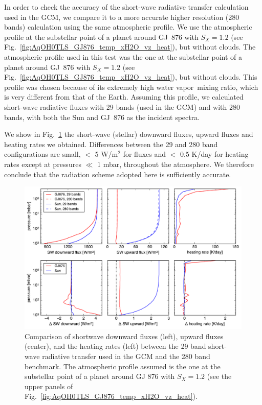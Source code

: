 \documentclass[11pt,numberedappendix,twocolappendix,]{emulateapj}
\newcommand{\wv}{{\color{orange}water vapor\ }}
\begin{document}
In order to check the accuracy of the short-wave radiative transfer calculation used in the GCM, we compare it to a more accurate higher resolution (280 bands) calculation using the same atmospheric profile. 
We use the atmospheric profile at the substellar point of a planet around GJ~876 with $S_X=1.2$ (see Fig.~\ref{fig:AqOH0TLS_GJ876_temp_xH2O_vz_heat}), but without clouds.
The atmospheric profile used in this test was the one at the substellar point of a planet around GJ~876 with $S_X=1.2$ (see Fig.~\ref{fig:AqOH0TLS_GJ876_temp_xH2O_vz_heat}), but without clouds. 
This profile was chosen because of its extremely high \wv mixing ratio, which is very different from that of the Earth. 
Assuming this profile, we calculated short-wave radiative fluxes with 29 bands (used in the GCM) and with 280 bands, with both the Sun and GJ~876 as the incident spectra.

We show in Fig.~\ref{fig:socrates} the short-wave (stellar) downward fluxes, upward fluxes and heating rates we obtained.
Differences between the 29 and 280 band configurations are small, $<$ 5 W/m$^2$ for fluxes and $<$ 0.5 K/day for heating rates except at pressures $\ll$ 1 mbar, throughout the atmosphere. We therefore conclude that the radiation scheme adopted here is sufficiently accurate.

\begin{figure}[!htb]
    \begin{center}
    \includegraphics[width=0.8\hsize]{fig/rad_comparison_SW29-SW280_AqOH0TLS_GJ876S12P20L40Q.pdf}
    \end{center}
\caption{Comparison of shortwave downward fluxes (left), upward fluxes (center), and the heating rates (left) between the 29 band short-wave radiative transfer used in the GCM and the 280 band benchmark. The atmospheric profile assumed is the one at the substellar point of a planet around GJ 876 with $S_X=1.2$ (see the upper panels of Fig.~\ref{fig:AqOH0TLS_GJ876_temp_xH2O_vz_heat}). }
\label{fig:socrates}
\end{figure}
\end{document}
